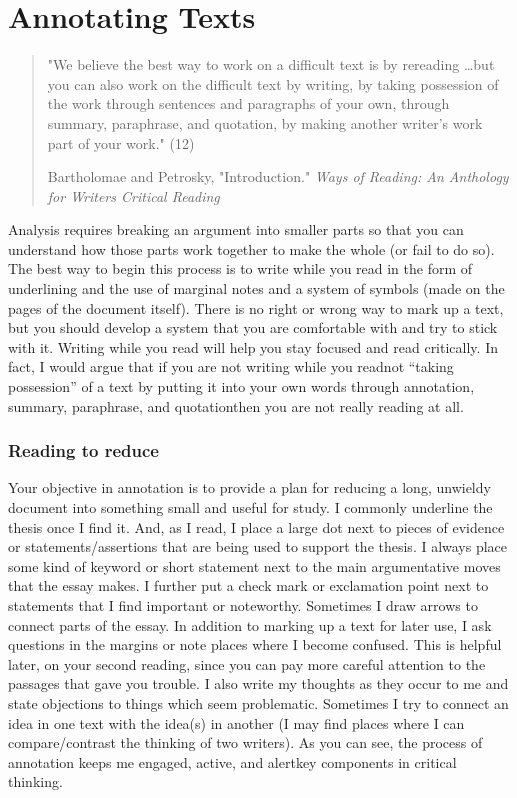 


\chapter{Annotating Texts}

\begin{quote}
\small
"We believe the best way to work on a difficult text is by rereading \dots but you can also work on the difficult text by writing, by taking possession of the work through sentences and paragraphs of your own, through summary, paraphrase, and quotation, by making another writer’s work part of your work." (12)

\textemdash Bartholomae and Petrosky, "Introduction." \emph{Ways of Reading: An Anthology for Writers
Critical Reading}

\end{quote}

Analysis requires breaking an argument into smaller parts so that you can understand how those parts work together to make the whole (or fail to do so). The best way to begin this process is to write while you read in the form of underlining and the use of marginal notes and a system of symbols (made on the pages of the document itself). There is no right or wrong way to mark up a text, but you should develop a system that you are comfortable with and try to stick with it. Writing while you read will help you stay focused and read critically. In fact, I would argue that if you are not writing while you read\textemdash not “taking possession” of a text by putting it into your own words through annotation, summary, paraphrase, and quotation\textemdash then you are not really reading at all.

\subsection{Reading to reduce}

Your objective in annotation is to provide a plan for reducing a long, unwieldy document into something small and useful for study. I commonly underline the thesis once I find it. And, as I read, I place a large dot next to pieces of evidence or statements/assertions that are being used to support the thesis. I always place some kind of keyword or short statement next to the main argumentative moves that the essay makes. I further put a check mark or exclamation point next to statements that I find important or noteworthy. Sometimes I draw arrows to connect parts of the essay. In addition to marking up a text for later use, I ask questions in the margins or note places where I become confused. This is helpful later, on your second reading, since you can pay more careful attention to the passages that gave you trouble. I also write my thoughts as they occur to me and state objections to things which seem problematic. Sometimes I try to connect an idea in one text with the idea(s) in another (I may find places where I can compare/contrast the thinking of two writers). As you can see, the process of annotation keeps me engaged, active, and alert\textemdash key components in critical thinking. 

